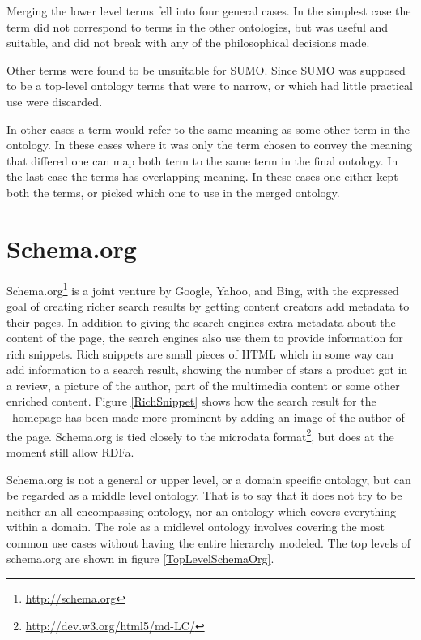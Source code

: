 Merging the lower level terms fell into four general cases.
In the simplest case the term did not correspond to terms in the other ontologies,
but was useful and suitable, and did not break with any of the philosophical decisions made.

Other terms were found to be unsuitable for SUMO.
Since SUMO was supposed to be a top-level ontology terms that were to narrow,
or which had little practical use were discarded.

In other cases a term would refer to the same meaning as some other term in the ontology.
In these cases where it was only the term chosen to convey the meaning that differed one can map both term to the same
term in the final ontology.
In the last case the terms has overlapping meaning.
In these cases one either kept both the terms, or picked which one to use in the merged ontology.


\section{Schema.org}
\label{schemadotorg}
Schema.org\footnote{\url{http://schema.org}} is a joint venture by Google, Yahoo, and Bing,
with the expressed goal of creating richer search results by getting content creators add metadata to their pages.
In addition to giving the search engines extra metadata about the content of the page,
the search engines also use them to provide information for rich snippets\citep{Guha2011}.
Rich snippets are small pieces of HTML which in some way can add information to a search result,
showing the number of stars a product got in a review, a picture of the author, part of the multimedia content
or some other enriched content\citep{Mayer2009}.
Figure \ref{RichSnippet} shows how the search result for the \theartefact\ homepage has been made more prominent by adding
an image of the author of the page.
Schema.org is tied closely to the microdata format\footnote{\url{http://dev.w3.org/html5/md-LC/}},
but does at the moment still allow RDFa.

Schema.org is not a general or upper level, or a domain specific ontology,
but can be regarded as a middle level ontology.
That is to say that it does not try to be neither an all-encompassing ontology,
nor an ontology which covers everything within a domain.
The role as a midlevel ontology involves covering the most common use cases without having the entire hierarchy modeled.
The top levels of schema.org are shown in figure \ref{TopLevelSchemaOrg}.

